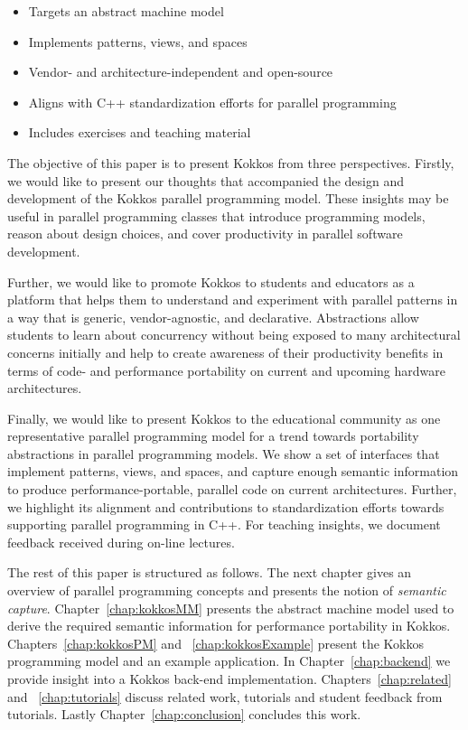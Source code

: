 \begin{itemize}
\item Targets an abstract machine model
\item Implements patterns, views, and spaces
\item Vendor- and architecture-independent and open-source
\item Aligns with C++ standardization efforts for parallel programming
\item Includes exercises and teaching material
\end{itemize}

The objective of this paper is to present Kokkos from three perspectives. Firstly, we would like to present our thoughts that accompanied the design and development of the Kokkos parallel programming model. These insights may be useful in parallel programming classes that introduce programming models, reason about design choices, and cover productivity in parallel software development.

Further, we would like to promote Kokkos to students and educators as a platform that helps them to understand and experiment with parallel patterns in a way that is generic, vendor-agnostic, and declarative. Abstractions allow students to learn about concurrency without being exposed to many architectural concerns initially and help to create awareness of their productivity benefits in terms of code- and performance portability on current and upcoming hardware architectures.

Finally, we would like to present Kokkos to the educational community as one representative parallel programming model for a trend towards portability abstractions in parallel programming models. We show a set of interfaces that implement patterns, views, and spaces, and capture enough semantic information to produce performance-portable, parallel code on current architectures. Further, we highlight its alignment and contributions to standardization efforts towards supporting parallel programming in C++. For teaching insights, we document feedback received during on-line lectures.

The rest of this paper is structured as follows. The next chapter gives an overview of parallel programming concepts and presents the notion of \emph{semantic capture}. Chapter~\ref{chap:kokkosMM} presents the abstract machine model used to derive the required semantic information for performance portability in Kokkos. Chapters~\ref{chap:kokkosPM} and ~\ref{chap:kokkosExample} present the Kokkos programming model and an example application. In Chapter~\ref{chap:backend} we provide insight into a Kokkos back-end implementation. Chapters~\ref{chap:related} and ~\ref{chap:tutorials} discuss related work, tutorials and student feedback from tutorials. Lastly Chapter~\ref{chap:conclusion} concludes this work.


